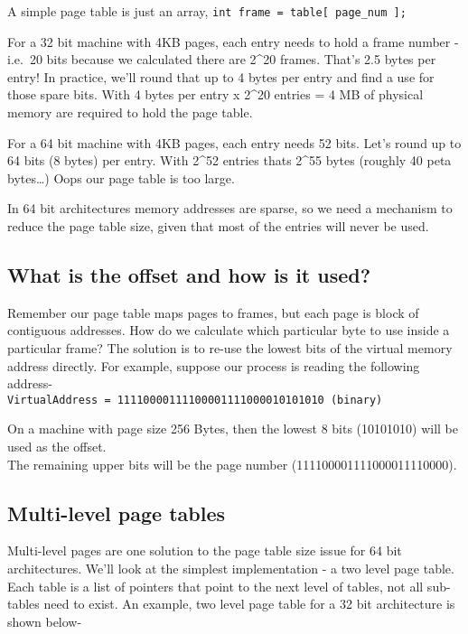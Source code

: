 A simple page table is just an array,
\texttt{int\ frame\ =\ table{[}\ page\_num\ {]};}

For a 32 bit machine with 4KB pages, each entry needs to hold a frame
number - i.e.~20 bits because we calculated there are 2\^{}20 frames.
That's 2.5 bytes per entry! In practice, we'll round that up to 4 bytes
per entry and find a use for those spare bits. With 4 bytes per entry x
2\^{}20 entries = 4 MB of physical memory are required to hold the page
table.

For a 64 bit machine with 4KB pages, each entry needs 52 bits. Let's
round up to 64 bits (8 bytes) per entry. With 2\^{}52 entries thats
2\^{}55 bytes (roughly 40 peta bytes\ldots{}) Oops our page table is too
large.

In 64 bit architectures memory addresses are sparse, so we need a
mechanism to reduce the page table size, given that most of the entries
will never be used.

\subsection{What is the offset and how is it
used?}\label{what-is-the-offset-and-how-is-it-used}

Remember our page table maps pages to frames, but each page is block of
contiguous addresses. How do we calculate which particular byte to use
inside a particular frame? The solution is to re-use the lowest bits of
the virtual memory address directly. For example, suppose our process is
reading the following
address-\\\texttt{VirtualAddress\ =\ 11110000111100001111000010101010\ (binary)}

On a machine with page size 256 Bytes, then the lowest 8 bits (10101010)
will be used as the offset.\\The remaining upper bits will be the page
number (111100001111000011110000).

\subsection{Multi-level page tables}\label{multi-level-page-tables}

Multi-level pages are one solution to the page table size issue for 64
bit architectures. We'll look at the simplest implementation - a two
level page table. Each table is a list of pointers that point to the
next level of tables, not all sub-tables need to exist. An example, two
level page table for a 32 bit architecture is shown below-

